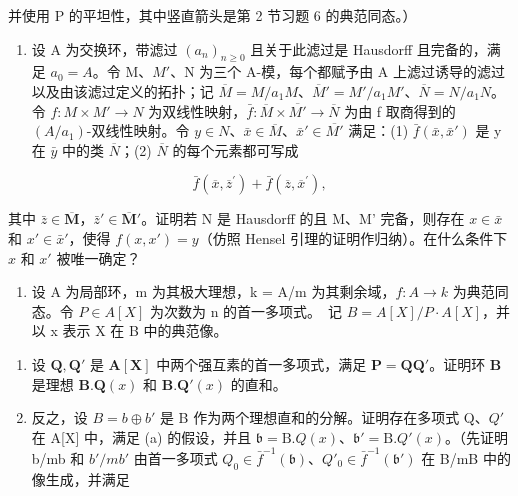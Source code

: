 并使用 P 的平坦性，其中竖直箭头是第 2 节习题 6 的典范同态。）


\begin{enumerate}
\def\labelenumi{\arabic{enumi}.}
\tightlist
\item
  设 A 为交换环，带滤过 \((a_{n})_{n\geq0}\) 且关于此滤过是 Hausdorff 且完备的，满足 \(a_{0}=A\)。令 M、\(M'\)、N 为三个 A-模，每个都赋予由 A 上滤过诱导的滤过以及由该滤过定义的拓扑；记 \(\overline{M}=M/a_{1}M\)、\(\overline{M}'=M'/a_{1}M'\)、\(\overline{N}=N/a_{1}N\)。令 \(f: M\times M'\to N\) 为双线性映射，\(\bar{f}: \overline{M}\times\overline{M'}\to\overline{N}\) 为由 f 取商得到的 \((A/a_{1})\)-双线性映射。令 \(y\in N\)、\(\bar{x}\in\overline{M}\)、\(\bar{x}'\in\overline{M'}\) 满足：(1) \(\bar{f}(\bar{x},\bar{x}')\) 是 y 在 \(\bar{y}\) 中的类 \(\overline{N}\)；(2) \(\overline{N}\) 的每个元素都可写成
\end{enumerate}

\[
\bar {f} (\overline {{{x}}}, \overline {{{z}}} ^ {\prime}) + \bar {f} (\overline {{{z}}}, \overline {{{x}}} ^ {\prime}),
\]

其中 \(\bar{z} \in \overline{\mathbf{M}}\)，\(\bar{z}' \in \overline{\mathbf{M}}'\)。证明若 N 是 Hausdorff 的且 M、M' 完备，则存在 \(x \in \bar{x}\) 和 \(x' \in \bar{x}'\)，使得 \(f(x, x') = y\)（仿照 Hensel 引理的证明作归纳）。在什么条件下 \(x\) 和 \(x'\) 被唯一确定？

\begin{enumerate}
\def\labelenumi{\arabic{enumi}.}
\setcounter{enumi}{1}
\tightlist
\item
  设 A 为局部环，m 为其极大理想，k = A/m 为其剩余域，\(f: A \to k\) 为典范同态。令 \(P \in A[X]\) 为次数为 n 的首一多项式。~记 \(B = A[X]/P \cdot A[X]\)，并以 x 表示 X 在 B 中的典范像。
\end{enumerate}

\begin{enumerate}
\def\labelenumi{(\alph{enumi})}
\item
   设 \(\mathbf{Q}, \mathbf{Q}'\) 是 \(\mathbf{A}[\mathbf{X}]\) 中两个强互素的首一多项式，满足 \(\mathbf{P} = \mathbf{QQ}'\)。证明环 \(\mathbf{B}\) 是理想 \(\mathbf{B}. \mathbf{Q}(x)\) 和 \(\mathbf{B}. \mathbf{Q}'(x)\) 的直和。
\item
  反之，设 \(B = b \oplus b'\) 是 B 作为两个理想直和的分解。证明存在多项式 Q、\(Q'\) 在 A{[}X{]} 中，满足 (a) 的假设，并且 \(\mathfrak{b} = \mathrm{B}.Q(x)\)、\(\mathfrak{b}' = \mathrm{B}.Q'(x)\)。（先证明 b/mb 和 \(b'/mb'\) 由首一多项式 \(Q_{0} \in \bar{f}^{-1}(\mathfrak{b})\)、\(Q'_{0} \in \bar{f}^{-1}(\mathfrak{b}')\) 在 B/mB 中的像生成，并满足
\end{enumerate}

